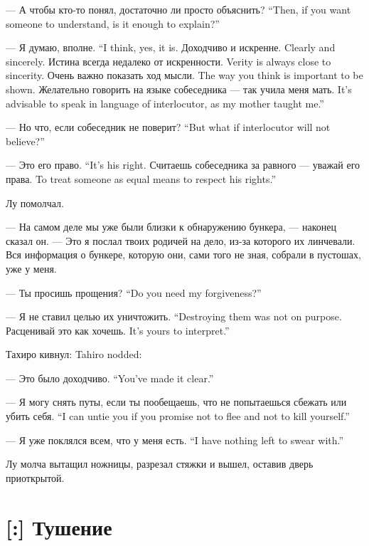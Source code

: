 {--- А чтобы кто-то понял, достаточно ли просто объяснить?}
{``Then, if you want someone to understand, is it enough to explain?''}

{--- Я думаю, вполне.}
{``I think, yes, it is.}
{Доходчиво и искренне.}
{Clearly and sincerely.}
{Истина всегда недалеко от искренности.}
{Verity is always close to sincerity.}
{Очень важно показать ход мысли.}
{The way you think is important to be shown.}
{Желательно говорить на языке собеседника --- так учила меня мать.}
{It's advisable to speak in language of interlocutor, as my mother taught me.''}

{--- Но что, если собеседник не поверит?}
{``But what if interlocutor will not believe?''}

{--- Это его право.}
{``It's his right.}
{Считаешь собеседника за равного --- уважай его права.}
{To treat someone as equal means to respect his rights.''}

Лу помолчал.

--- На самом деле мы уже были близки к обнаружению бункера, --- наконец сказал он.
--- Это я послал твоих родичей на дело, из-за которого их линчевали.
Вся информация о бункере, которую они, сами того не зная, собрали в пустошах, уже у меня.

{--- Ты просишь прощения?}
{``Do you need my forgiveness?''}

{--- Я не ставил целью их уничтожить.}
{``Destroying them was not on purpose.}
{Расценивай это как хочешь.}
{It's yours to interpret.''}

{Тахиро кивнул:}
{Tahiro nodded:}

{--- Это было доходчиво.}
{``You've made it clear.''}

{--- Я могу снять путы, если ты пообещаешь, что не попытаешься сбежать или убить себя.}
{``I can untie you if you promise not to flee and not to kill yourself.''}

{--- Я уже поклялся всем, что у меня есть.}
{``I have nothing left to swear with.''}

Лу молча вытащил ножницы, разрезал стяжки и вышел, оставив дверь приоткрытой.

\section{[:] Тушение}

\textspace

